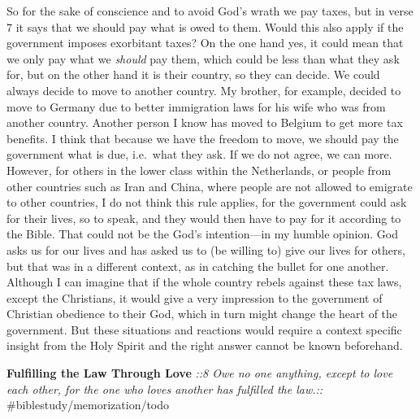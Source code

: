 So for the sake of conscience and to avoid God's wrath we pay taxes, but
in verse 7 it says that we should pay what is owed to them. Would this
also apply if the government imposes exorbitant taxes? On the one hand
yes, it could mean that we only pay what we \emph{should} pay them,
which could be less than what they ask for, but on the other hand it is
their country, so they can decide. We could always decide to move to
another country. My brother, for example, decided to move to Germany due
to better immigration laws for his wife who was from another country.
Another person I know has moved to Belgium to get more tax benefits. I
think that because we have the freedom to move, we should pay the
government what is due, i.e.~what they ask. If we do not agree, we can
more. However, for others in the lower class within the Netherlands, or
people from other countries such as Iran and China, where people are not
allowed to emigrate to other countries, I do not think this rule
applies, for the government could ask for their lives, so to speak, and
they would then have to pay for it according to the Bible. That could
not be the God's intention---in my humble opinion. God asks us for our
lives and has asked us to (be willing to) give our lives for others, but
that was in a different context, as in catching the bullet for one
another. Although I can imagine that if the whole country rebels against
these tax laws, except the Christians, it would give a very impression
to the government of Christian obedience to their God, which in turn
might change the heart of the government. But these situations and
reactions would require a context specific insight from the Holy Spirit
and the right answer cannot be known beforehand.

\textbf{Fulfilling the Law Through Love} \emph{::8 Owe no one anything,
except to love each other, for the one who loves another has fulfilled
the law.::} \#biblestudy/memorization/todo

